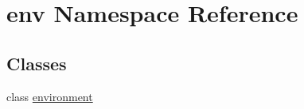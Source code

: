 \hypertarget{namespaceenv}{\section{env Namespace Reference}
\label{namespaceenv}
}
\subsection*{Classes}
\begin{DoxyCompactItemize}
\item 
class \hyperlink{classenv_1_1environment}{environment}
\end{DoxyCompactItemize}
